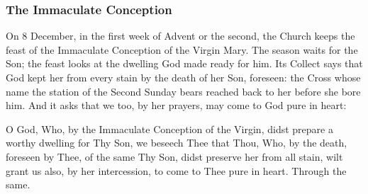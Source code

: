 \subsubsection*{The Immaculate Conception}

On 8 December, in the first week of Advent or the second, the Church keeps the
feast of the Immaculate Conception of the Virgin Mary. The season waits for the
Son; the feast looks at the dwelling God made ready for him. Its Collect says
that God kept her from every stain by the death of her Son, foreseen: the Cross
whose name the station of the Second Sunday bears reached back to her before she
bore him. And it asks that we too, by her prayers, may come to God pure in
heart:

\begin{studyframe}
\medskip

O God, Who, by the Immaculate Conception of the Virgin, didst prepare a worthy
dwelling for Thy Son, we beseech Thee that Thou, Who, by the death, foreseen by
Thee, of the same Thy Son, didst preserve her from all stain, wilt grant us
also, by her intercession, to come to Thee pure in heart. Through the same.\par
\end{studyframe}
